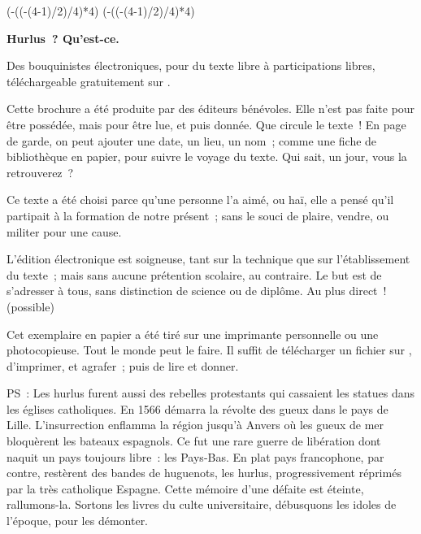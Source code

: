\documentclass[french,twoside]{book} %
\def\truncdiv#1#2{((#1-(#2-1)/2)/#2)}
\def\moduloop#1#2{(#1-\truncdiv{#1}{#2}*#2)}
\def\modulo#1#2{\number\numexpr\moduloop{#1}{#2}\relax}
\begin{document}
 


\ifbooklet
  \pagestyle{empty}
  \clearpage
  \ifnum\modulo{\value{page}}{4}=0 \hbox{}\newpage\hbox{}\newpage\fi
  \ifnum\modulo{\value{page}}{4}=1 \hbox{}\newpage\hbox{}\newpage\fi


  \hbox{}\newpage
  \ifodd\value{page}\hbox{}\newpage\fi
  {\centering\color{rubric}\bfseries\noindent\large
    Hurlus ? Qu’est-ce.\par
    \bigskip
  }
  \noindent Des bouquinistes électroniques, pour du texte libre à participations libres,
  téléchargeable gratuitement sur \href{https://hurlus.fr}{}.\par
  \bigskip
  \noindent Cette brochure a été produite par des éditeurs bénévoles.
  Elle n’est pas faite pour être possédée, mais pour être lue, et puis donnée.
  Que circule le texte !
  En page de garde, on peut ajouter une date, un lieu, un nom ;
  comme une fiche de bibliothèque en papier,
  pour suivre le voyage du texte. Qui sait, un jour, vous la retrouverez ?
  \par

  Ce texte a été choisi parce qu’une personne l’a aimé,
  ou haï, elle a pensé qu’il partipait à la formation de notre présent ;
  sans le souci de plaire, vendre, ou militer pour une cause.
  \par

  L’édition électronique est soigneuse, tant sur la technique
  que sur l’établissement du texte ; mais sans aucune prétention scolaire, au contraire.
  Le but est de s’adresser à tous, sans distinction de science ou de diplôme.
  Au plus direct ! (possible)
  \par

  Cet exemplaire en papier a été tiré sur une imprimante personnelle
   ou une photocopieuse. Tout le monde peut le faire.
  Il suffit de
  télécharger un fichier sur \href{https://hurlus.fr}{},
  d’imprimer, et agrafer ; puis de lire et donner.\par

  \bigskip

  \noindent PS : Les hurlus furent aussi des rebelles protestants qui cassaient les statues dans les églises catholiques. En 1566 démarra la révolte des gueux dans le pays de Lille. L’insurrection enflamma la région jusqu’à Anvers où les gueux de mer bloquèrent les bateaux espagnols.
  Ce fut une rare guerre de libération dont naquit un pays toujours libre : les Pays-Bas.
  En plat pays francophone, par contre, restèrent des bandes de huguenots, les hurlus, progressivement réprimés par la très catholique Espagne.
  Cette mémoire d’une défaite est éteinte, rallumons-la. Sortons les livres du culte universitaire, débusquons les idoles de l’époque, pour les démonter.
\fi
\end{document}
